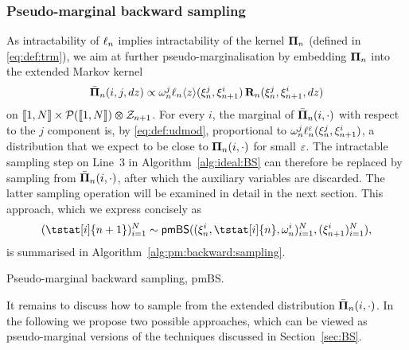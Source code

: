 \subsubsection{Pseudo-marginal backward sampling}
\label{eq:sec:backward:sampling:pseudo:marg}

As intractability of $\ell_{n}$ implies intractability of the kernel $\boldsymbol{\Pi}_{n}$ (defined in \eqref{eq:def:trm}), we aim at further pseudo-marginalisation by embedding $\boldsymbol{\Pi}_{n}$ into the extended Markov kernel  
$$
\bar{\boldsymbol{\Pi}}_{n}(i, j, d z) \propto \omega_{n}^{j} \ell_{n} \langle z \rangle(\xi_{n}^{j}, \xi_{n + 1}^{i}) \, \mathbf{R}_{n}(\xi_{n}^{j}, \xi_{n + 1}^{i}, d z)
$$
on $\llbracket 1, N \rrbracket \times \mathcal{P}(\llbracket 1, N \rrbracket) \varotimes \mathcal{Z}_{n + 1}$. For every $i$, the marginal of $\bar{\boldsymbol{\Pi}}_{n}(i, \cdot)$ with respect to the $j$ component is, by \eqref{eq:def:udmod}, proportional to $\omega_{n}^{j} \ell^\varepsilon_{n}(\xi_{n}^{j}, \xi_{n + 1}^{i})$, a distribution that we expect to be close to $\boldsymbol{\Pi}_{n}(i, \cdot)$ for small $\varepsilon$. The intractable sampling step on Line~3 in Algorithm~\ref{alg:ideal:BS} can therefore be replaced by sampling from $\bar{\boldsymbol{\Pi}}_{n}(i, \cdot)$, after which the auxiliary variables are discarded. The latter sampling operation will be examined in detail in the next section. This approach, which we express concisely as 
$$
    (\tstat[i]{n + 1})_{i = 1}^\N \sim \mathsf{pmBS}((\epart{n}{i}, \tstat[i]{n}, \ewght{n}{i})_{i = 1}^\N, (\epart{n + 1}{i})_{i = 1}^\N), 
$$
is summarised in Algorithm~\ref{alg:pm:backward:sampling}.  

\begin{algorithm}[h] 
\caption{Pseudo-marginal backward sampling, \textsf{pmBS}.} \label{alg:pm:backward:sampling}
\end{algorithm}

It remains to discuss how to sample from the extended distribution $\bar{\boldsymbol{\Pi}}_{n}(i, \cdot)$. 
In the following we propose two possible approaches, which can be viewed as pseudo-marginal versions of the techniques discussed in Section~\ref{sec:BS}.  

